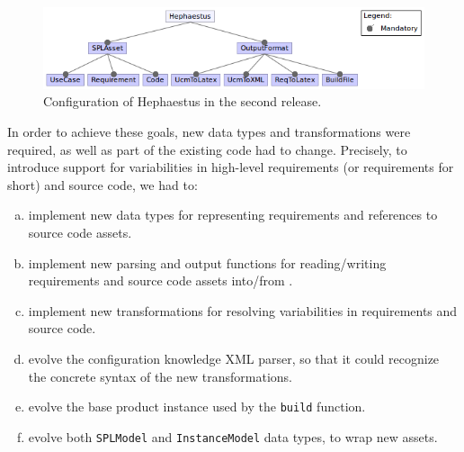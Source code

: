 \begin{figure}[bth]
\begin{center}
\includegraphics[scale=0.6]{imagens/conf1b-hp.png}
\caption{Configuration of Hephaestus in the second release.}
\label{fig:hephaestus-conf1b}
\end{center}
\end{figure}





In order to achieve these goals, new data types and transformations were required, as
well as part of the existing code had to change. Precisely, to introduce support for variabilities in 
high-level requirements (or requirements for short) and source code, we had to:

\begin{enumerate}[(a)]
 \item implement new data types for representing requirements and
   references to source code assets.

 \item implement new parsing and output functions for reading/writing requirements and source code assets into/from \hp.

 \item implement new transformations for resolving variabilities in  requirements and source code.

 \item evolve the configuration knowledge XML parser, so that it could recognize the concrete syntax of the new transformations.

 \item evolve the base product instance used by the \texttt{build} function.

 \item evolve both \texttt{SPLModel} and \texttt{InstanceModel} data types, to wrap new assets.




\end{enumerate}

